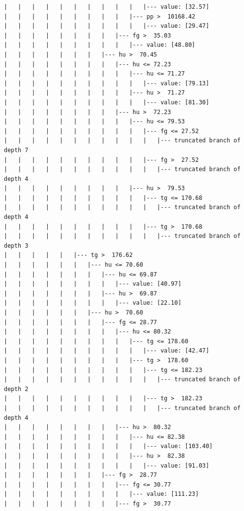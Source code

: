 \documentclass[UTF8, a4paper]{ctexart}
\begin{document}
\begin{lstlisting}
|   |   |   |   |   |   |   |   |   |   |--- value: [32.57]
|   |   |   |   |   |   |   |   |   |--- pp >  10168.42
|   |   |   |   |   |   |   |   |   |   |--- value: [29.47]
|   |   |   |   |   |   |   |   |--- fg >  35.03
|   |   |   |   |   |   |   |   |   |--- value: [48.80]
|   |   |   |   |   |   |   |--- hu >  70.45
|   |   |   |   |   |   |   |   |--- hu <= 72.23
|   |   |   |   |   |   |   |   |   |--- hu <= 71.27
|   |   |   |   |   |   |   |   |   |   |--- value: [79.13]
|   |   |   |   |   |   |   |   |   |--- hu >  71.27
|   |   |   |   |   |   |   |   |   |   |--- value: [81.30]
|   |   |   |   |   |   |   |   |--- hu >  72.23
|   |   |   |   |   |   |   |   |   |--- hu <= 79.53
|   |   |   |   |   |   |   |   |   |   |--- fg <= 27.52
|   |   |   |   |   |   |   |   |   |   |   |--- truncated branch of depth 7
|   |   |   |   |   |   |   |   |   |   |--- fg >  27.52
|   |   |   |   |   |   |   |   |   |   |   |--- truncated branch of depth 4
|   |   |   |   |   |   |   |   |   |--- hu >  79.53
|   |   |   |   |   |   |   |   |   |   |--- tg <= 170.68
|   |   |   |   |   |   |   |   |   |   |   |--- truncated branch of depth 4
|   |   |   |   |   |   |   |   |   |   |--- tg >  170.68
|   |   |   |   |   |   |   |   |   |   |   |--- truncated branch of depth 3
|   |   |   |   |   |--- tg >  176.62
|   |   |   |   |   |   |--- hu <= 70.60
|   |   |   |   |   |   |   |--- hu <= 69.87
|   |   |   |   |   |   |   |   |--- value: [40.97]
|   |   |   |   |   |   |   |--- hu >  69.87
|   |   |   |   |   |   |   |   |--- value: [22.10]
|   |   |   |   |   |   |--- hu >  70.60
|   |   |   |   |   |   |   |--- fg <= 28.77
|   |   |   |   |   |   |   |   |--- hu <= 80.32
|   |   |   |   |   |   |   |   |   |--- tg <= 178.60
|   |   |   |   |   |   |   |   |   |   |--- value: [42.47]
|   |   |   |   |   |   |   |   |   |--- tg >  178.60
|   |   |   |   |   |   |   |   |   |   |--- tg <= 182.23
|   |   |   |   |   |   |   |   |   |   |   |--- truncated branch of depth 2
|   |   |   |   |   |   |   |   |   |   |--- tg >  182.23
|   |   |   |   |   |   |   |   |   |   |   |--- truncated branch of depth 4
|   |   |   |   |   |   |   |   |--- hu >  80.32
|   |   |   |   |   |   |   |   |   |--- hu <= 82.38
|   |   |   |   |   |   |   |   |   |   |--- value: [103.40]
|   |   |   |   |   |   |   |   |   |--- hu >  82.38
|   |   |   |   |   |   |   |   |   |   |--- value: [91.03]
|   |   |   |   |   |   |   |--- fg >  28.77
|   |   |   |   |   |   |   |   |--- fg <= 30.77
|   |   |   |   |   |   |   |   |   |--- value: [111.23]
|   |   |   |   |   |   |   |   |--- fg >  30.77

\end{lstlisting}
\end{document}

